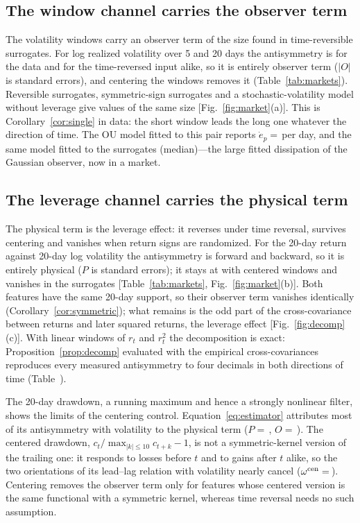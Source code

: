 \subsection{The window channel carries the observer term}\label{sec:window}

The volatility windows carry an observer term of the size found in time-reversible surrogates. For log realized volatility over 5 and 20 days the antisymmetry is \OmWinFwd for the data and for the time-reversed input alike, so it is entirely observer term ($|O|$ is \WinOz standard errors), and centering the windows removes it (Table~\ref{tab:markets}). Reversible surrogates, symmetric-sign surrogates and a stochastic-volatility model without leverage give values of the same size [Fig.~\ref{fig:market}(a)]. This is Corollary~\ref{cor:single} in data: the short window leads the long one whatever the direction of time. The OU model fitted to this pair reports $\dot e_p=\,$\EpWinObs per day, and the same model fitted to the surrogates \EpWinSurMed (median)---the large fitted dissipation of the Gaussian observer, now in a market.

\subsection{The leverage channel carries the physical term}\label{sec:leverage}

The physical term is the leverage effect: it reverses under time reversal, survives centering and vanishes when return signs are randomized. For the 20-day return against 20-day log volatility the antisymmetry is \OmLevFwd forward and \OmLevRev backward, so it is entirely physical ($P$ is \LevPz standard errors); it stays at \OmLevCen with centered windows and vanishes in the surrogates [Table~\ref{tab:markets}, Fig.~\ref{fig:market}(b)]. Both features have the same 20-day support, so their observer term vanishes identically (Corollary~\ref{cor:symmetric}); what remains is the odd part of the cross-covariance between returns and later squared returns, the leverage effect \cite{black1976,bouchaud2001} [Fig.~\ref{fig:decomp}(c)]. With linear windows of $r_t$ and $r_t^2$ the decomposition is exact: Proposition~\ref{prop:decomp} evaluated with the empirical cross-covariances reproduces every measured antisymmetry to four decimals in both directions of time (Table~).

The 20-day drawdown, a running maximum and hence a strongly nonlinear filter, shows the limits of the centering control. Equation~\eqref{eq:estimator} attributes most of its antisymmetry with volatility to the physical term ($P=\,$\DDP, $O=\,$\DDO). The centered drawdown, $c_t/\max_{|k|\le10}c_{t+k}-1$, is not a symmetric-kernel version of the trailing one: it responds to losses before $t$ and to gains after $t$ alike, so the two orientations of its lead--lag relation with volatility nearly cancel ($\omega^{\rm cen}=\,$\DDCen). Centering removes the observer term only for features whose centered version is the same functional with a symmetric kernel, whereas time reversal needs no such assumption.

